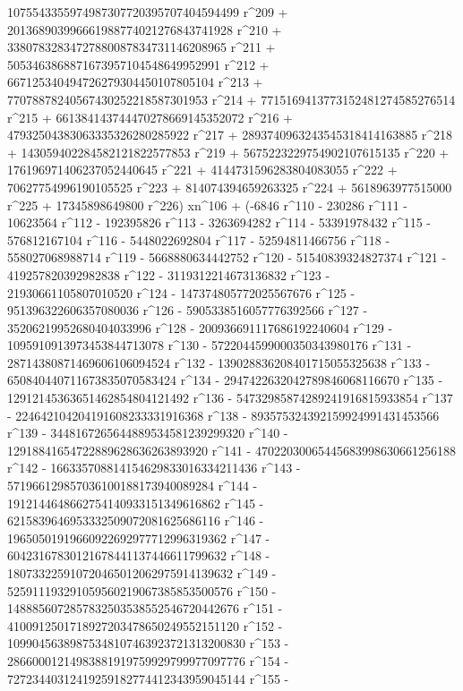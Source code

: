        1075543355974987307720395707404594499 r^209 + 
       201368903996661988774021276843741928 r^210 + 
       33807832834727880087834731146208965 r^211 + 
       5053463868871673957104548649952991 r^212 + 
       667125340494726279304450107805104 r^213 + 
       77078878240567430252218587301953 r^214 + 
       7715169413773152481274585276514 r^215 + 
       661384143744470278669145352072 r^216 + 
       47932504383063335326280285922 r^217 + 
       2893740963243545318414163885 r^218 + 
       143059402284582121822577853 r^219 + 
       5675223229754902107615135 r^220 + 
       176196971406237052440645 r^221 + 
       4144731596283804083055 r^222 + 70627754996190105525 r^223 + 
       814074394659263325 r^224 + 5618963977515000 r^225 + 
       17345898649800 r^226) xn^106 + (-6846 r^110 - 230286 r^111 - 
       10623564 r^112 - 192395826 r^113 - 3263694282 r^114 - 
       53391978432 r^115 - 576812167104 r^116 - 5448022692804 r^117 - 
       52594811466756 r^118 - 558027068988714 r^119 - 
       5668880634442752 r^120 - 51540839324827374 r^121 - 
       419257820392982838 r^122 - 3119312214673136832 r^123 - 
       21930661105807010520 r^124 - 147374805772025567676 r^125 - 
       951396322606357080036 r^126 - 5905338516057776392566 r^127 - 
       35206219952680404033996 r^128 - 
       200936691117686192240604 r^129 - 
       1095910913973453844713078 r^130 - 
       5722044599000350343980176 r^131 - 
       28714380871469606106094524 r^132 - 
       139028836208401715055325638 r^133 - 
       650840440711673835070583424 r^134 - 
       2947422632042789846068116670 r^135 - 
       12912145363651462854804121492 r^136 - 
       54732985874289241916815933854 r^137 - 
       224642104204191608233331916368 r^138 - 
       893575324392159924991431453566 r^139 - 
       3448167265644889534581239299320 r^140 - 
       12918841654722889628636263893920 r^141 - 
       47022030065445683998630661256188 r^142 - 
       166335708814154629833016334211436 r^143 - 
       571966129857036100188173940089284 r^144 - 
       1912144648662754140933151349616862 r^145 - 
       6215839646953332509072081625686116 r^146 - 
       19650501919660922692977712996319362 r^147 - 
       60423167830121678441137446611799632 r^148 - 
       180733225910720465012062975914139632 r^149 - 
       525911193291059560219067385853500576 r^150 - 
       1488856072857832503538552546720442676 r^151 - 
       4100912501718927203478650249552151120 r^152 - 
       10990456389875348107463923721313200830 r^153 - 
       28660001214983881919759929799977097776 r^154 - 
       72723440312419259182774412343959045144 r^155 - 
